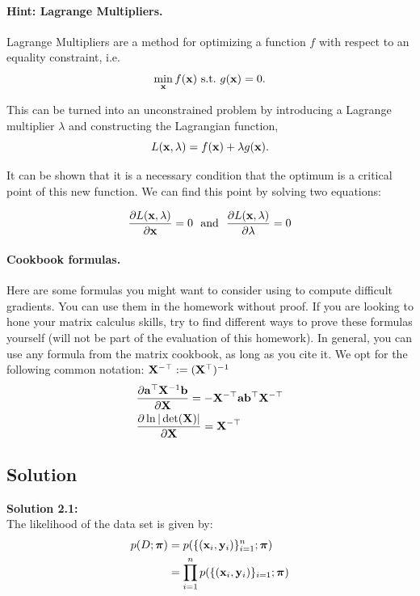 \documentclass[submit]{harvardml}
\begin{document}
\begin{problem}
\paragraph{Hint: Lagrange Multipliers.} Lagrange Multipliers are a method for
optimizing a function $f$ with respect to an
equality constraint, i.e.
\[\min_{\mathbf{x}} f(\mathbf{x})\ \text{s.t.}\ g(\mathbf{x}) = 0.\]

This can be turned into an unconstrained problem by introducing a
Lagrange multiplier $\lambda$ and constructing the Lagrangian function,
\[L(\mathbf{x}, \lambda) =  f(\mathbf{x}) + \lambda g(\mathbf{x}).\]

It can be shown that it is a necessary condition that the optimum
is a critical point of this new function. We can find this point by solving two equations:

\[\frac{\partial L(\mathbf{x}, \lambda)}{\partial  \mathbf{x}} = 0  \ \ \text{and}\  \  \frac{\partial L(\mathbf{x}, \lambda)}{\partial \lambda} = 0 \]


\paragraph{Cookbook formulas.} Here are some formulas you might want to consider
using to compute difficult gradients. You can use them  in the homework
without proof. If you are looking to hone your matrix calculus skills, try to
find different ways to prove these formulas yourself (will not be part of the
evaluation of this homework). In general, you can use any formula from the matrix cookbook,
as long as you cite it. We opt for the following common notation:
$\mathbf{X}^{-\top} := (\mathbf{X}^{\top})^{-1}$
\begin{align*}
  & \frac{\partial \mathbf{a}^\top \mathbf{X}^{-1} \mathbf{b}}{\partial \mathbf{X}} = - \mathbf{X}^{-\top} \mathbf{a} \mathbf{b}^\top \mathbf{X}^{-\top} \\
  & \frac{\partial \ln | \det (\mathbf{X}) |}{\partial \mathbf{X}} = \mathbf{X}^{-\top}
 \end{align*}
 \end{problem}


\subsection*{Solution}

\noindent\textbf{Solution 2.1:}\\
The likelihood of the data set is given by:
\begin{align*}
    p(D ; \boldsymbol{\pi}) &= p(\{(\mathbf{x}_i, \mathbf{y}_i)\}_{i=1}^n; \boldsymbol{\pi})\\
    &= \prod_{i=1}^{n} p(\{(\mathbf{x}_i, \mathbf{y}_i)\}_{i=1}; \boldsymbol{\pi})
\end{align*}
\end{document}
